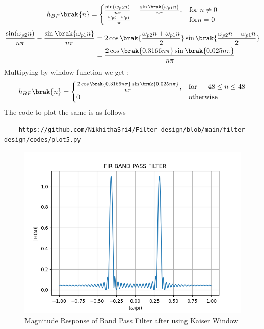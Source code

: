 \documentclass{article}
\begin{document}
\begin{align}
    h_{BP}\brak{n} = 
\begin{cases} 
    \frac{\sin(w_{p2} n)}{n\pi} -\frac{\sin\brak{\omega_{p1}n}}{n\pi},  & \text{for } n\neq 0\\\
    \frac{\omega_{p2}-\omega_{p1}}{\pi} &\text{for} n= 0
\end{cases} \label{eq:h(n)desired_for_LPF_part_2}
\end{align}
\begin{align}
     \frac{\sin(\omega_{p2} n)}{n\pi} -\frac{\sin\brak{\omega_{p1}n}}{n\pi} &= 2\cos{\brak{\frac{\omega_{p2}n+\omega_{p1}n}{2}}}\sin{\brak{\frac{\omega_{p2}n-\omega_{p1}n}{2}}}\\
            &= \frac{2\cos{\brak{0.3166n\pi}}\sin{\brak{0.025n\pi}}}{n\pi}
\end{align}
Multipying by window function we get :
\begin{align}
    h_{BP}\brak{n} = 
\begin{cases} 
   \frac{2\cos{\brak{0.3166n\pi}}\sin{\brak{0.025n\pi}}}{n\pi},  & \text{for } -48\leq n \leq 48 \\
    0 &\text{otherwise}
\end{cases} \label{eq:h(n)desired_for_BPF}
\end{align}
The code to plot the same is as follows
\begin{lstlisting}
    https://github.com/NikhithaSri4/Filter-design/blob/main/filter-design/codes/plot5.py
\end{lstlisting}
\begin{figure}[H]
\centering
\includegraphics[width=1\columnwidth]{figs/FIR_Bandpass_Filter.png}
\caption{Magnitude Response of Band Pass Filter after using Kaiser Window}
\label{fig:Kaiser_BPF_response}
\end{figure}
\end{document}
